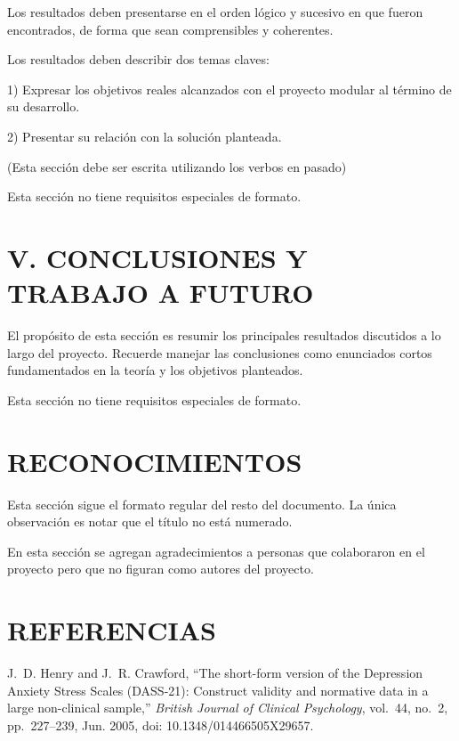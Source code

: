 ﻿\documentclass[10pt,twocolumn]{article}
\begin{document}
Los resultados deben presentarse en el orden lógico y sucesivo en que fueron encontrados, de forma que sean comprensibles y coherentes.

Los resultados deben describir dos temas claves:

1) Expresar los objetivos reales alcanzados con el proyecto modular al término de su desarrollo.

2) Presentar su relación con la solución planteada.

(Esta sección debe ser escrita utilizando los verbos en pasado)

Esta sección no tiene requisitos especiales de formato.

\section*{V. CONCLUSIONES Y TRABAJO A FUTURO}
El propósito de esta sección es resumir los principales resultados discutidos a lo largo del proyecto. Recuerde manejar las conclusiones como enunciados cortos fundamentados en la teoría y los objetivos planteados.

Esta sección no tiene requisitos especiales de formato.

\section*{RECONOCIMIENTOS}
Esta sección sigue el formato regular del resto del documento. La única observación es notar que el título no está numerado.

En esta sección se agregan agradecimientos a personas que colaboraron en el proyecto pero que no figuran como autores del proyecto.

\section*{REFERENCIAS}
\begin{thebibliography}{12}
  J.~D. Henry and J.~R. Crawford, ``The short-form version of the Depression Anxiety Stress Scales (DASS{-}21): Construct validity and normative data in a large non-clinical sample,'' \emph{British Journal of Clinical Psychology}, vol.~44, no.~2, pp.~227--239, Jun. 2005, doi: 10.1348/014466505X29657.
\end{thebibliography}
\end{document}
